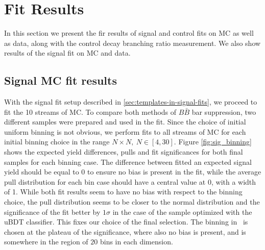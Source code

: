 \section{Fit Results}
In this section we present the fir results of signal and control fits on MC as well as data, along with the control decay branching ratio measurement. We also show results of the signal fit on MC and data.

\subsection{Signal MC fit results}\label{sec:signal-mc-fit-results}

With the signal fit setup described in \ref{sec:templates-in-signal-fits}, we proceed to fit the 10 streams of MC. To compare both methods of $B \bar B$ bar suppression, two different samples were prepared and used in the fit. Since the choice of initial uniform binning is not obvious, we perform fits to all streams of MC for each initial binning choice in the range $N\times N,~N\in[4,30]$. Figure \ref{fig:sig_binning} shows the expected yield differences, pulls and fit significances for both final samples for each binning case. The difference between fitted an expected signal yield should be equal to 0 to ensure no bias is present in the fit, while the average pull distribution for each bin case should have a central value at 0, with a width of 1.  While both fit results seem to have no bias with respect to the binning choice, the pull distribution seems to be closer to the normal distribution and the significance of the fit better by $1\sigma$ in the case of the sample optimized with the uBDT classifier. This fixes our choice of the final selection. The binning in \vars~is chosen at the plateau of the significance, where also no bias is present, and is somewhere in the region of $20$ bins in each dimension.

